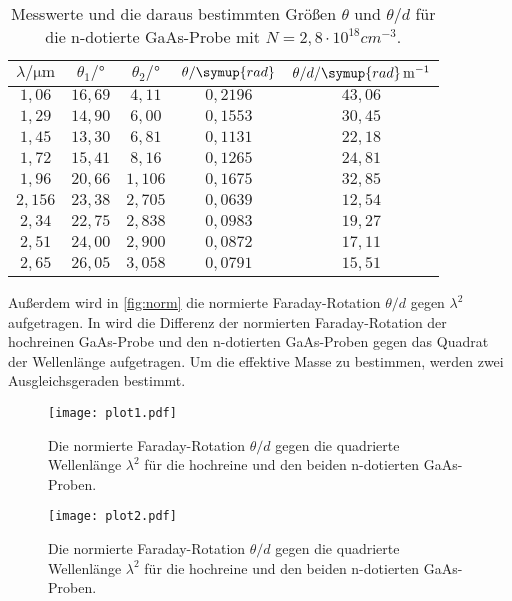 \begin{table}[hbt!]
  \centering
  \caption{Messwerte und die daraus bestimmten Größen $\theta$ und $\theta/d$ für die n-dotierte GaAs-Probe
  mit $N=2,8 \cdot 10^{18} \si{cm}^{-3}$.}
  \label{tab:m3}
  \begin{tabular}{c c c c c}
    \toprule
    $\lambda/\si{\micro\meter}$ & $\theta_{1}/\si{\degree}$ & $\theta_{2}/\si{\degree}$ & $\theta/\symup{rad}$ & $\theta/d/\symup{rad}\, \si{m}^{-1}$\\
    \midrule
    $1,06 $ & $16,69$ & $4,11$  & $0,2196$ & $43,06$ \\
    $1,29 $ & $14,90$ & $6,00$  & $0,1553$ & $30,45$ \\
    $1,45 $ & $13,30$ & $6,81$  & $0,1131$ & $22,18$ \\
    $1,72 $ & $15,41$ & $8,16$  & $0,1265$ & $24,81$ \\
    $1,96 $ & $20,66$ & $1,106$ & $0,1675$ & $32,85$ \\
    $2,156$ & $23,38$ & $2,705$ & $0,0639$ & $12,54$ \\
    $2,34 $ & $22,75$ & $2,838$ & $0,0983$ & $19,27$ \\
    $2,51 $ & $24,00$ & $2,900$ & $0,0872$ & $17,11$ \\
    $2,65 $ & $26,05$ & $3,058$ & $0,0791$ & $15,51$ \\
    \bottomrule
  \end{tabular}
\end{table}
Außerdem wird in \autoref{fig:norm} die normierte Faraday-Rotation $\theta/d$ gegen $\lambda^2$ aufgetragen.
In wird die Differenz der normierten Faraday-Rotation der hochreinen GaAs-Probe und den n-dotierten GaAs-Proben
gegen das Quadrat der Wellenlänge aufgetragen. Um die effektive Masse zu bestimmen, werden zwei Ausgleichsgeraden
bestimmt.
\begin{figure}[hbt!]
  \label{fig:norm}
  \texttt{[image: plot1.pdf]}
  \caption{Die normierte Faraday-Rotation $\theta/d$ gegen die quadrierte Wellenlänge $\lambda^2$ für die
  hochreine und den beiden n-dotierten GaAs-Proben.}
\end{figure}

\begin{figure}[hbt!]
  \label{fig:diff}
  \texttt{[image: plot2.pdf]}
  \caption{Die normierte Faraday-Rotation $\theta/d$ gegen die quadrierte Wellenlänge $\lambda^2$ für die
  hochreine und den beiden n-dotierten GaAs-Proben.}
\end{figure}